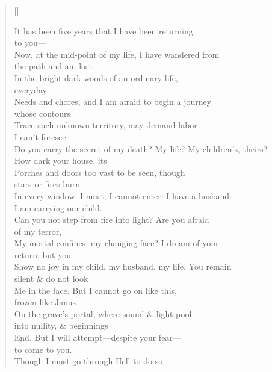 \label{ch:inferno}
\settowidth{\versewidth}{Do you carry the secret of my death? My life? My children's, theirs?}
\begin{verse}[\versewidth]
\begin{altverse}
It has been five years that I have been returning\\
to you---\\
Now, at the mid-point of my life, I have wandered from\\
the path and am lost\\
In the bright dark woods of an ordinary life,\\
everyday\\
Needs and chores, and I am afraid to begin a journey\\
whose contours\\
Trace such unknown territory, may demand labor\\
I can't foresee.\\
Do you carry the secret of my death? My life? My children's, theirs?\\
How dark your house, its\\
Porches and doors too vast to be seen, though\\
stars or fires burn\\
In every window. I must, I cannot enter: I have a husband:\\
I am carrying our child.\\
Can you not step from fire into light? Are you afraid\\
of my terror,\\
My mortal confines, my changing face? I dream of your\\
return, but you\\
Show no joy in my child, my husband, my life. You remain\\
silent \& do not look\\
Me in the face. But I cannot go on like this,\\
frozen like Janus\\
On the grave's portal, where sound \& light pool\\
into nullity, \& beginnings\\
End. But I will attempt---despite your fear---\\
to come to you.\\
Though I must go through Hell to do so.
\end{altverse}
\end{verse}
